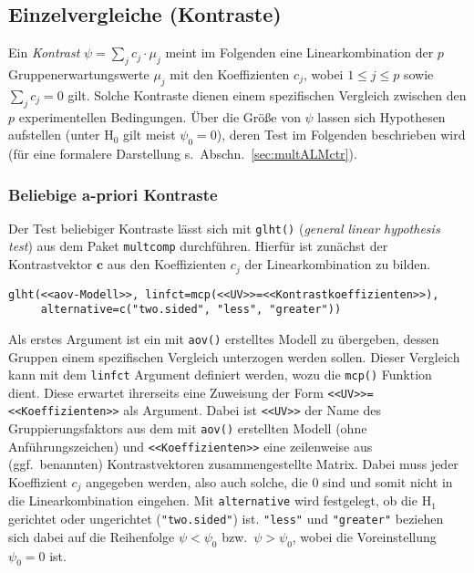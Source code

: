 \subsection{Einzelvergleiche (Kontraste)}

Ein \emph{Kontrast} $\psi = \sum_{j} c_{j} \cdot \mu_{j}$ meint im Folgenden eine Linearkombination der $p$ Gruppenerwartungswerte $\mu_{j}$ mit den Koeffizienten $c_{j}$, wobei $1 \leq j \leq p$ sowie $\sum_{j} c_{j} = 0$ gilt. Solche Kontraste dienen einem spezifischen Vergleich zwischen den $p$ experimentellen Bedingungen. Über die Größe von $\psi$ lassen sich Hypothesen aufstellen (unter $\text{H}_{0}$ gilt meist $\psi_{0} = 0$), deren Test im Folgenden beschrieben wird (für eine formalere Darstellung s.\ Abschn.\ \ref{sec:multALMctr}).

\subsubsection{Beliebige a-priori Kontraste}
\label{sec:contrCRp}

Der Test beliebiger Kontraste lässt sich mit \lstinline!glht()! (\emph{general linear hypothesis test}) aus dem Paket \lstinline!multcomp! \cite{Hothorn2008} durchführen. Hierfür ist zunächst der Kontrastvektor $\bm{c}$ aus den Koeffizienten $c_{j}$ der Linearkombination zu bilden.
\begin{lstlisting}
glht(<<aov-Modell>>, linfct=mcp(<<UV>>=<<Kontrastkoeffizienten>>),
     alternative=c("two.sided", "less", "greater"))
\end{lstlisting}

Als erstes Argument ist ein mit \lstinline!aov()! erstelltes Modell zu übergeben, dessen Gruppen einem spezifischen Vergleich unterzogen werden sollen. Dieser Vergleich kann mit dem \lstinline!linfct! Argument definiert werden, wozu die \lstinline!mcp()! Funktion dient. Diese erwartet ihrerseits eine Zuweisung der Form \lstinline!<<UV>>=<<Koeffizienten>>! als Argument. Dabei ist \lstinline!<<UV>>! der Name des Gruppierungsfaktors aus dem mit \lstinline!aov()! erstellten Modell (ohne Anführungszeichen) und \lstinline!<<Koeffizienten>>! eine zeilenweise aus (ggf.\ benannten) Kontrastvektoren zusammengestellte Matrix. Dabei muss jeder Koeffizient $c_{j}$ angegeben werden, also auch solche, die $0$ sind und somit nicht in die Linearkombination eingehen. Mit \lstinline!alternative! wird festgelegt, ob die $\text{H}_{1}$ gerichtet oder ungerichtet (\lstinline!"two.sided"!) ist. \lstinline!"less"! und \lstinline!"greater"! beziehen sich dabei auf die Reihenfolge $\psi < \psi_{0}$ bzw.\ $\psi > \psi_{0}$, wobei die Voreinstellung $\psi_{0} = 0$ ist.


